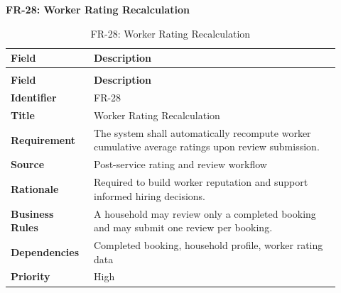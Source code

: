 \documentclass[12pt,a4paper]{article}
\begin{document}
\noindent\textbf{FR-28: Worker Rating Recalculation}\par
\vspace{4pt}
\begingroup\small\setlength{\tabcolsep}{4pt}\renewcommand{\arraystretch}{1.15}
\begin{longtable}{|>{\raggedright\arraybackslash}p{0.22\linewidth}|>{\raggedright\arraybackslash}p{0.70\linewidth}|}
\caption{FR-28: Worker Rating Recalculation}\label{tab:fr-28}\\
\hline
\textbf{Field} & \textbf{Description} \\ \hline
\endfirsthead
\multicolumn{2}{c}{Table \thetable\ Worker Rating Recalculation (continued)}\\
\hline
\textbf{Field} & \textbf{Description} \\ \hline
\endhead
\textbf{Identifier} & FR-28 \\ \hline
\textbf{Title} & Worker Rating Recalculation \\ \hline
\textbf{Requirement} & The system shall automatically recompute worker cumulative average ratings upon review submission. \\ \hline
\textbf{Source} & Post-service rating and review workflow \\ \hline
\textbf{Rationale} & Required to build worker reputation and support informed hiring decisions. \\ \hline
\textbf{Business Rules} & A household may review only a completed booking and may submit one review per booking. \\ \hline
\textbf{Dependencies} & Completed booking, household profile, worker rating data \\ \hline
\textbf{Priority} & High \\ \hline
\end{longtable}
\endgroup
\clearpage
\end{document}
